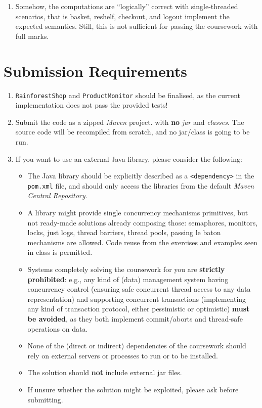 \documentclass{article}
\begin{document}
\begin{itemize}
\begin{enumerate}
		\item Somehow, the computations are ``logically'' correct with single-threaded scenarios, that is \textsf{basket}, \textsf{reshelf}, \textsf{checkout}, and \textsf{logout} implement the expected semantics. Still, this is not sufficient for passing the coursework with full marks. 
		\end{enumerate}
	\end{itemize}
	
	\section*{Submission Requirements}
	\begin{enumerate}
		\item \texttt{RainforestShop} and \texttt{ProductMonitor} should be finalised, as the current implementation does not pass the provided tests!
		\item Submit the code as a zipped \textit{Maven} project. with \textbf{no} \textit{jar} and \textit{classes}. The source code will be recompiled from scratch, and no jar/class is going to be run.
		 
		\item If you want to use an external Java library, please consider the following:
		\begin{itemize}
			\item The Java library should be explicitly described as a \texttt{<dependency>} in the \texttt{pom.xml} file, and should only access the libraries from the default \textit{Maven Central Repository}.
			\item A library might provide single concurrency mechanisms primitives, but not ready-made solutions already composing those: semaphores, monitors, locks, just logs, thread barriers, thread pools, passing le baton mechanisms are allowed. Code reuse from the exercises and examples seen in class is permitted.
			
			\item Systems completely solving the coursework for you are \textbf{strictly prohibited}: e.g., any kind of (data) management system having concurrency control (ensuring safe concurrent thread access to any data representation) and supporting concurrent transactions (implementing any kind of transaction protocol, either pessimistic or optimistic) \textbf{must be avoided}, as they both implement commit/aborts and thread-safe operations on data. 
			\item None of the (direct or indirect) dependencies of the coursework should rely on external servers or processes to run or to be installed.
			\item The solution should \textbf{not} include external jar files.
			\item If unsure whether the solution might be exploited, please ask before submitting.
		\end{itemize}
		 

\end{enumerate}
\end{document}
